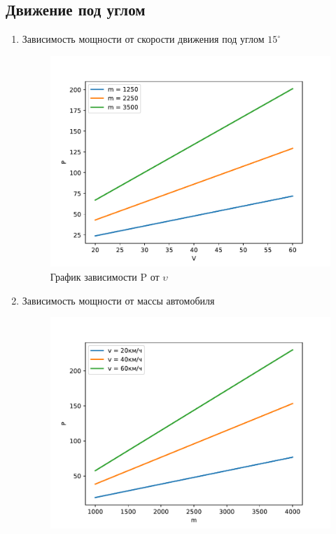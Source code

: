 \documentclass[a4paper, 14pt]{extarticle}
\begin{document}
		\subsection{Движение под углом}
			\begin{enumerate}
				\item Зависимость мощности от скорости движения под углом \( 15^\circ \)
				\begin{figure}[H]
					\centering
					\includegraphics[width = \linewidth]{fig1.pdf}
					\caption[.] {График зависимости P от \( \upsilon \)}
				\end{figure}
				\pagebreak
				\item Зависимость мощности от массы автомобиля
					\begin{figure}[H]
						\centering
						\includegraphics[width = \linewidth]{fig2.pdf}

\end{figure}
\end{enumerate}
\end{document}
